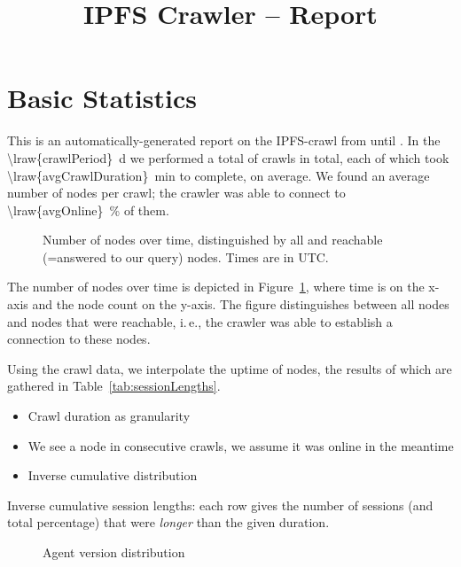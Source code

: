\documentclass[10pt]{article}
\title{IPFS Crawler -- Report}
\makeatletter
\newcommand*{\ie}{i.\,e.\@\xspace}
\makeatother
\begin{document}
\maketitle


\section{Basic Statistics}
\label{sec:basic}

This is an automatically-generated report on the IPFS-crawl from until .
In the \SI{\lraw{crawlPeriod}}{\day} we performed a total of  crawls in total, each of which took \SI{\lraw{avgCrawlDuration}}{\minute} to complete, on average.
We found an average number of  nodes per crawl; the crawler was able to connect to \SI{\lraw{avgOnline}}{\percent} of them.
%
\begin{figure}
  
  \caption{Number of nodes over time, distinguished by all and reachable (=answered to our query) nodes. Times are in UTC.}
  \label{fig:num_nodes}
\end{figure}
%
The number of nodes over time is depicted in Figure~\ref{fig:num_nodes}, where time is on the x-axis and the node count on the y-axis.
The figure distinguishes between all nodes and nodes that were reachable, \ie, the crawler was able to establish a connection to these nodes.

Using the crawl data, we interpolate the uptime of nodes, the results of which are gathered in Table~\ref{tab:sessionLengths}.
\begin{itemize}
  \item Crawl duration as granularity
  \item We see a node in consecutive crawls, we assume it was online in the meantime
  \item Inverse cumulative distribution
\end{itemize}
%
\begin{table}
  \center
  
  \caption{Inverse cumulative session lengths: each row gives the number of sessions (and total percentage) that were \emph{longer} than the given duration.}
  \label{tab:sessionLengths}
\end{table}
%
\begin{figure}
  
  \caption{Agent version distribution}
  \label{figs:agent_version_distribution}
\end{figure}
\end{document}
